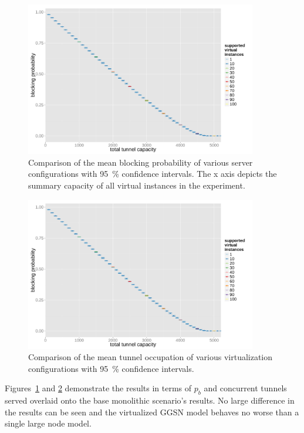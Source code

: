 \begin{figure}[htb]
	\centering
	\includegraphics[width=0.9\textwidth]{images/R-virtualized-blocking.pdf}
	\caption{Comparison of the mean blocking probability of various server configurations with \SI{95}{\percent} confidence intervals. The x axis depicts the summary capacity of all virtual instances in the experiment.}
\label{c4:fig:virtualized_blocking}
\end{figure}

\begin{figure}[htb]
	\centering
	\includegraphics[width=0.9\textwidth]{images/R-virtualized-tunnelusage.pdf}
	\caption{Comparison of the mean tunnel occupation of various virtualization configurations with \SI{95}{\percent} confidence intervals.}
\label{c4:fig:virtualized_tunnelusage}
\end{figure}

Figures~\ref{c4:fig:virtualized_blocking} and \ref{c4:fig:virtualized_tunnelusage} demonstrate the results in terms of $p_b$ and concurrent tunnels served overlaid onto the base monolithic scenario's results. No large difference in the results can be seen and the virtualized \gls{GGSN} model behaves no worse than a single large node model.


